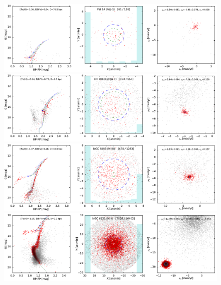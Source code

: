\documentclass[usenatbib]{mnras}
\begin{document}
\clearpage\begin{figure}
\contcaption{}
\includegraphics{figs/Pal_14.pdf}
\includegraphics{figs/Lynga_7_BH184.pdf}
\includegraphics{figs/NGC_6093_M_80.pdf}
\includegraphics{figs/NGC_6121_M_4.pdf}
\end{figure}
\end{document}

